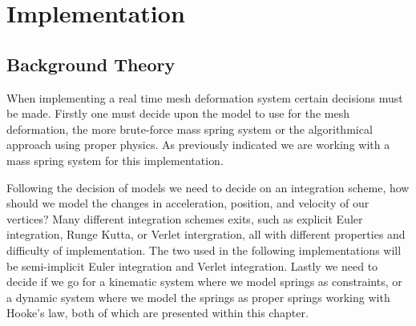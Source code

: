 \chapter{Implementation}
\section{Background Theory}
\label{chap:implementation}
When implementing a real time mesh deformation system certain decisions must be made.
Firstly one must decide upon the model to use for the mesh deformation, the more brute-force mass spring system or the algorithmical approach using proper physics.
As previously indicated we are working with a mass spring system for this implementation.

Following the decision of models we need to decide on an integration scheme, how should we model the changes in acceleration, position, and velocity of our vertices?
Many different integration schemes exits, such as explicit Euler integration, Runge Kutta, or Verlet intergration, all with different properties and difficulty of implementation.
The two used in the following implementations will be semi-implicit Euler integration and Verlet integration.
Lastly we need to decide if we go for a kinematic system where we model springs as constraints, 
or a dynamic system where we model the springs as proper springs working with Hooke's law\cite{math_for_games}, both of which are presented within this chapter.




%

